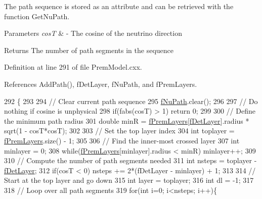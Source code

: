 The path sequence is stored as an attribute and can be retrieved with the function Get\+Nu\+Path.


\begin{DoxyParams}{Parameters}
{\em cosT} & -\/ The cosine of the neutrino direction \\
\hline
\end{DoxyParams}
\begin{DoxyReturn}{Returns}
The number of path segments in the sequence 
\end{DoxyReturn}


Definition at line 291 of file Prem\+Model.\+cxx.



References Add\+Path(), f\+Det\+Layer, f\+Nu\+Path, and f\+Prem\+Layers.


\begin{DoxyCode}
292 \{
293 
294   \textcolor{comment}{// Clear current path sequence}
295   \hyperlink{classOscProb_1_1PremModel_afb5674b8b06add6b981e557d7b07016c}{fNuPath}.clear();
296   
297   \textcolor{comment}{// Do nothing if cosine is unphysical}
298   \textcolor{keywordflow}{if}(fabs(cosT) > 1) \textcolor{keywordflow}{return} 0;
299 
300   \textcolor{comment}{// Define the minimum path radius}
301   \textcolor{keywordtype}{double} minR = \hyperlink{classOscProb_1_1PremModel_ac33265ceae42c59a5e11ca416eff93b0}{fPremLayers}[\hyperlink{classOscProb_1_1PremModel_a4fb68506493666349f418b893a996185}{fDetLayer}].radius * sqrt(1 - cosT*cosT);
302 
303   \textcolor{comment}{// Set the top layer index}
304   \textcolor{keywordtype}{int} toplayer = \hyperlink{classOscProb_1_1PremModel_ac33265ceae42c59a5e11ca416eff93b0}{fPremLayers}.size() - 1;
305   
306   \textcolor{comment}{// Find the inner-most crossed layer}
307   \textcolor{keywordtype}{int} minlayer = 0;
308   \textcolor{keywordflow}{while}(\hyperlink{classOscProb_1_1PremModel_ac33265ceae42c59a5e11ca416eff93b0}{fPremLayers}[minlayer].radius < minR) minlayer++; 
309 
310   \textcolor{comment}{// Compute the number of path segments needed}
311   \textcolor{keywordtype}{int} nsteps = toplayer - \hyperlink{classOscProb_1_1PremModel_a4fb68506493666349f418b893a996185}{fDetLayer};
312   \textcolor{keywordflow}{if}(cosT < 0) nsteps += 2*(fDetLayer - minlayer) + 1;
313 
314   \textcolor{comment}{// Start at the top layer and go down}
315   \textcolor{keywordtype}{int} layer = toplayer;
316   \textcolor{keywordtype}{int} dl = -1;
317   
318   \textcolor{comment}{// Loop over all path segments}
319   \textcolor{keywordflow}{for}(\textcolor{keywordtype}{int} i=0; i<nsteps; i++)\{

\end{DoxyCode}
